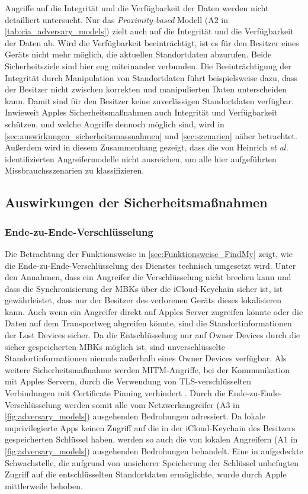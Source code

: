 Angriffe auf die Integrität und die Verfügbarkeit der Daten werden \cite{Heinrich_FindMy} nicht detailliert untersucht.
Nur das \textit{Proximity-based} Modell (A2 in \autoref{tab:cia_adversary_models}) zielt auch auf die Integrität und die Verfügbarkeit der Daten ab.
Wird die Verfügbarkeit beeinträchtigt, ist es für den Besitzer eines Geräts nicht mehr möglich, die aktuellen Standortdaten abzurufen.
Beide Sicherheitsziele sind hier eng miteinander verbunden.
Die Beeinträchtigung der Integrität durch Manipulation von Standortdaten führt beispielsweise dazu, dass der Besitzer nicht zwischen korrekten und manipulierten Daten unterscheiden kann.
Damit sind für den Besitzer keine zuverlässigen Standortdaten verfügbar.
Inwieweit Apples Sicherheitsmaßnahmen auch Integrität und Verfügbarkeit schützen, und welche Angriffe dennoch möglich sind, wird in \autoref{sec:auswirkungen_sicherheitsmassnahmen} und \autoref{sec:szenarien} näher betrachtet.
Außerdem wird in diesem Zusammenhang gezeigt, dass die von Heinrich \textit{et al.} \cite{Heinrich_FindMy} identifizierten Angreifermodelle nicht ausreichen, um alle hier aufgeführten Missbrauchsszenarien zu klassifizieren.

\subsection{Auswirkungen der Sicherheitsmaßnahmen}
\label{sec:auswirkungen_sicherheitsmassnahmen}

\subsubsection{Ende-zu-Ende-Verschlüsselung}
Die Betrachtung der Funktionsweise in \autoref{sec:Funktionsweise_FindMy} zeigt, wie die Ende-zu-Ende-Verschlüsselung des Dienstes technisch umgesetzt wird.
Unter den Annahmen, dass ein Angreifer die Verschlüsselung nicht brechen kann und dass die Synchronisierung der \acp{MBK} über die iCloud-Keychain sicher ist, ist gewährleistet, dass nur der Besitzer des verlorenen Geräts dieses lokalisieren kann.
Auch wenn ein Angreifer direkt auf Apples Server zugreifen könnte oder die Daten auf dem Transportweg abgreifen könnte, sind die Standortinformationen der Lost Devices sicher.
Da die Entschlüsselung nur auf Owner Devices durch die sicher gespeicherten \acp{MBK} möglich ist, sind unverschlüsselte Standortinformationen niemals außerhalb eines Owner Devices verfügbar.
Als weitere Sicherheitsmaßnahme werden \ac{MITM}-Angriffe, bei der Kommunikation mit Apples Servern, durch die Verwendung von \ac{TLS}-verschlüsselten Verbindungen mit Certificate Pinning verhindert \cite{Heinrich_FindMy}.
Durch die Ende-zu-Ende-Verschlüsselung werden somit alle vom Netzwerkangreifer (A3 in \autoref{fig:adversary_models}) ausgehenden Bedrohungen adressiert.
Da lokale unprivilegierte Apps keinen Zugriff auf die in der iCloud-Keychain des Besitzers gespeicherten Schlüssel haben, werden so auch die von  lokalen Angreifern (A1 in \autoref{fig:adversary_models}) ausgehenden Bedrohungen behandelt.
Eine in \cite{Heinrich_FindMy} aufgedeckte Schwachstelle, die aufgrund von unsicherer Speicherung der Schlüssel unbefugten Zugriff auf die entschlüsselten Standortdaten ermöglichte, wurde durch Apple mittlerweile behoben.

